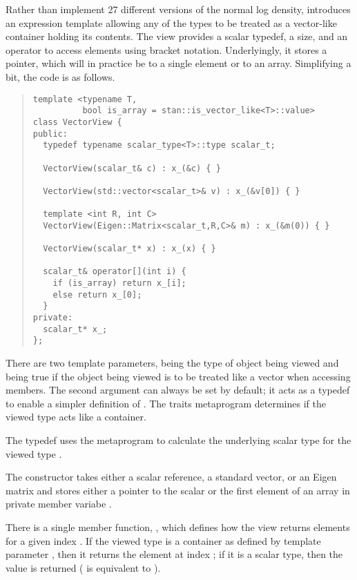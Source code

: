 \documentclass[10pt]{article}
\begin{document}
Rather than implement 27 different versions of the normal log density,
 introduces an expression template allowing any of
the types to be treated as a vector-like container holding its
contents.  The view provides a scalar typedef, a size, and an operator
to access elements using bracket notation.  Underlyingly, it stores a
pointer, which will in practice be to a single element or to an array.
Simplifying a bit, the code is as follows.
%
\begin{quote}
\begin{Verbatim}
template <typename T,
          bool is_array = stan::is_vector_like<T>::value>
class VectorView {
public: 
  typedef typename scalar_type<T>::type scalar_t;

  VectorView(scalar_t& c) : x_(&c) { }

  VectorView(std::vector<scalar_t>& v) : x_(&v[0]) { }

  template <int R, int C>
  VectorView(Eigen::Matrix<scalar_t,R,C>& m) : x_(&m(0)) { }

  VectorView(scalar_t* x) : x_(x) { }

  scalar_t& operator[](int i) {
    if (is_array) return x_[i];
    else return x_[0]; 
  }
private:
  scalar_t* x_;
};
\end{Verbatim}
\end{quote}
%
There are two template parameters,  being the type of object
being viewed and  being true if the object being
viewed is to be treated like a vector when accessing members. The
second argument can always be set by default; it acts as a typedef to
enable a simpler definition of .  The traits
metaprogram  determines if the viewed
type  acts like a container.

The typedef  uses the metaprogram
 to calculate the underlying scalar type
for the viewed type .  

The constructor takes either a scalar reference, a standard vector, or
an Eigen matrix and stores either a pointer to the scalar or the first
element of an array in private member variabe .

There is a single member function, , which defines
how the view returns elements for a given index .  If the
viewed type is a container as defined by template parameter
, then it returns the element at index ; if it
is a scalar type, then the value is returned ( is
equivalent to ).
\end{document}
